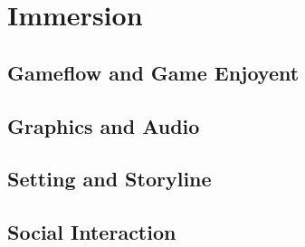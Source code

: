 \chapter{Immersion}
\section{Gameflow and Game Enjoyent}
\section{Graphics and Audio}
\section{Setting and Storyline}
\section{Social Interaction}
